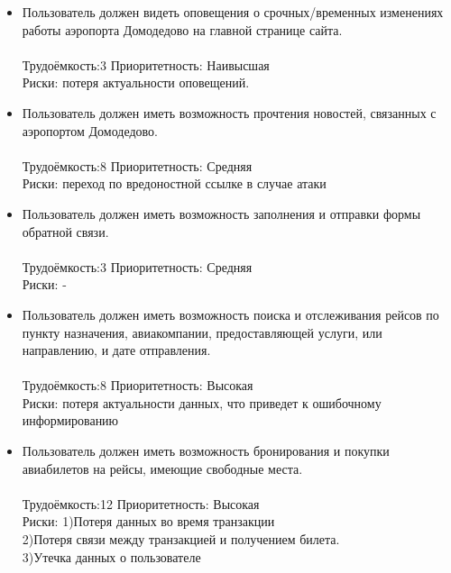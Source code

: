 \begin{enumerate}
      \begin{itemize}
            \item Пользователь должен видеть оповещения о
            срочных/временных изменениях работы аэропорта
            Домодедово на главной странице сайта.
                  \\\\
                  Трудоёмкость:3    Приоритетность: Наивысшая \\Риски: потеря актуальности оповещений.
                  \\
            \item Пользователь должен иметь возможность прочтения
                  новостей, связанных с аэропортом Домодедово.
                  \\\\
                  Трудоёмкость:8    Приоритетность: Средняя \\Риски: переход по вредоностной ссылке в случае атаки
                  \\
            \item Пользователь должен иметь возможность заполнения
                  и отправки формы обратной связи.
                  \\\\
                  Трудоёмкость:3    Приоритетность: Средняя \\Риски: -
                  \\
            \item Пользователь должен иметь возможность поиска
                  и отслеживания рейсов по пункту назначения,
                  авиакомпании, предоставляющей услуги, или
                  направлению, и дате отправления.
                  \\\\
                  Трудоёмкость:8    Приоритетность: Высокая \\Риски: потеря актуальности данных, что приведет к ошибочному информированию
                  \\
            \item Пользователь должен иметь возможность бронирования
                  и покупки авиабилетов на рейсы, имеющие
                  свободные места.
                  \\\\
                  Трудоёмкость:12    Приоритетность: Высокая \\Риски: 1)Потеря данных во время транзакции\\2)Потеря связи между транзакцией и получением билета.\\3)Утечка данных о пользователе

\end{itemize}
\end{enumerate}
